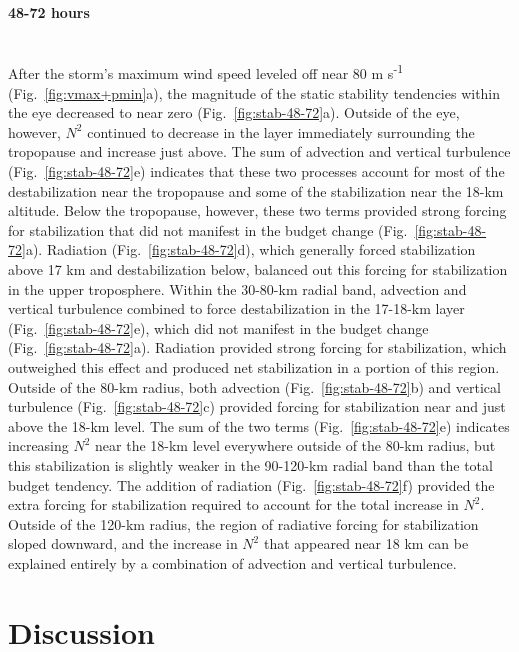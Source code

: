 \documentclass{ametsoc}
\begin{document}
\paragraph{48-72 hours}\mbox{}\\
\indent After the storm's maximum wind speed leveled off near 80 m s\textsuperscript{-1} (Fig.~\ref{fig:vmax+pmin}a), the magnitude of the static stability tendencies within the eye decreased to near zero (Fig.~\ref{fig:stab-48-72}a).
Outside of the eye, however, $N^2$ continued to decrease in the layer immediately surrounding the tropopause and increase just above.
The sum of advection and vertical turbulence (Fig.~\ref{fig:stab-48-72}e) indicates that these two processes account for most of the destabilization near the tropopause and some of the stabilization near the 18-km altitude.
Below the tropopause, however, these two terms provided strong forcing for stabilization that did not manifest in the budget change (Fig.~\ref{fig:stab-48-72}a).
Radiation (Fig.~\ref{fig:stab-48-72}d), which generally forced stabilization above 17 km and destabilization below, balanced out this forcing for stabilization in the upper troposphere.
Within the 30-80-km radial band, advection and vertical turbulence combined to force destabilization in the 17-18-km layer (Fig.~\ref{fig:stab-48-72}e), which did not manifest in the budget change (Fig.~\ref{fig:stab-48-72}a).
Radiation provided strong forcing for stabilization, which outweighed this effect and produced net stabilization in a portion of this region.
Outside of the 80-km radius, both advection (Fig.~\ref{fig:stab-48-72}b) and vertical turbulence (Fig.~\ref{fig:stab-48-72}c) provided forcing for stabilization near and just above the 18-km level.
The sum of the two terms (Fig.~\ref{fig:stab-48-72}e) indicates increasing $N^2$ near the 18-km level everywhere outside of the 80-km radius, but this stabilization is slightly weaker in the 90-120-km radial band than the total budget tendency.
The addition of radiation (Fig.~\ref{fig:stab-48-72}f) provided the extra forcing for stabilization required to account for the total increase in $N^2$.
Outside of the 120-km radius, the region of radiative forcing for stabilization sloped downward, and the increase in $N^2$ that appeared near 18 km can be explained entirely by a combination of advection and vertical turbulence.

  \section{Discussion}
\end{document}
